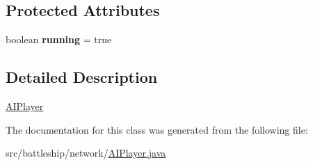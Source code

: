 \subsection*{Protected Attributes}
\begin{DoxyCompactItemize}
\item 
\hypertarget{classbattleship_1_1network_1_1AIPlayer_acb6b06315b68f923dd798fd6a43a9671}{}boolean {\bfseries running} = true\label{classbattleship_1_1network_1_1AIPlayer_acb6b06315b68f923dd798fd6a43a9671}

\end{DoxyCompactItemize}


\subsection{Detailed Description}
\hyperlink{classbattleship_1_1network_1_1AIPlayer}{A\+I\+Player} 

The documentation for this class was generated from the following file\+:\begin{DoxyCompactItemize}
\item 
src/battleship/network/\hyperlink{AIPlayer_8java}{A\+I\+Player.\+java}\end{DoxyCompactItemize}
